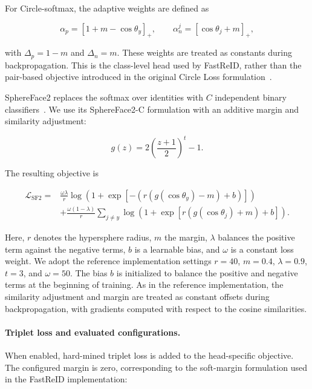 \documentclass{llncs}
\begin{document}
For Circle-softmax, the adaptive weights are defined as

\begin{equation}
\alpha_p=[1+m-\cos\theta_y]_+,
\qquad
\alpha_n^j=[\cos\theta_j+m]_+,
\end{equation}

with $\Delta_p=1-m$ and $\Delta_n=m$. These weights are treated as constants during backpropagation. This is the class-level head used by FastReID, rather than the pair-based objective introduced in the original Circle Loss formulation~\cite{sun2020circle,song2020strong}.

SphereFace2 replaces the softmax over identities with $C$ independent binary classifiers~\cite{wen2022sphereface2}. We use its SphereFace2-C formulation with an additive margin and similarity adjustment:

\begin{equation}
g(z)=2\left(\frac{z+1}{2}\right)^t-1.
\end{equation}

The resulting objective is

\begin{equation}
\begin{split}
\mathcal{L}_{\mathrm{SF2}}={}&
\frac{\omega\lambda}{r}
\log\left(1+\exp\left[-\left(r(g(\cos\theta_y)-m)+b\right)\right]\right)
\\
&+
\frac{\omega(1-\lambda)}{r}
\sum_{j\ne y}
\log\left(1+\exp\left[r(g(\cos\theta_j)+m)+b\right]\right).
\end{split}
\end{equation}

Here, $r$ denotes the hypersphere radius, $m$ the margin, $\lambda$ balances the positive term against the negative terms, $b$ is a learnable bias, and $\omega$ is a constant loss weight. We adopt the reference implementation settings $r=40$, $m=0.4$, $\lambda=0.9$, $t=3$, and $\omega=50$. The bias $b$ is initialized to balance the positive and negative terms at the beginning of training. As in the reference implementation, the similarity adjustment and margin are treated as constant offsets during backpropagation, with gradients computed with respect to the cosine similarities.

\paragraph{Triplet loss and evaluated configurations.}
When enabled, hard-mined triplet loss is added to the head-specific objective. The configured margin is zero, corresponding to the soft-margin formulation used in the FastReID implementation:
\end{document}
